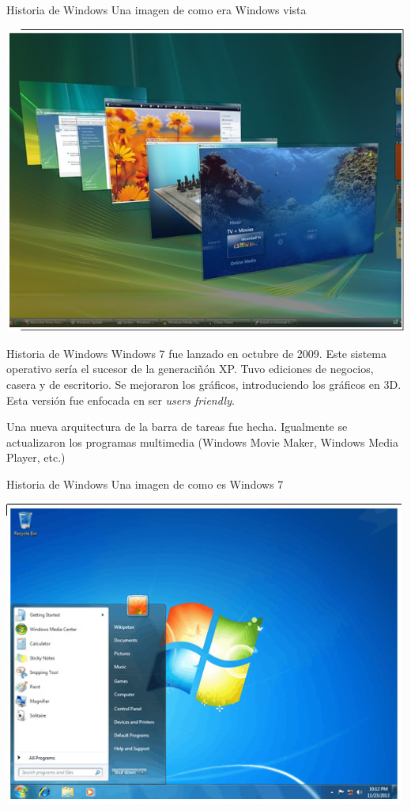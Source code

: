 \documentclass[11pt]{beamer}
\begin{document}
		\begin{frame}{Historia de Windows}
			Una imagen de como era Windows vista
			
			\includegraphics[scale=0.5]{wvista.jpg}
		\end{frame}		
		\begin{frame}{Historia de Windows}
			Windows 7 fue lanzado en octubre de 2009. Este sistema operativo sería el sucesor de la generaciñón XP. Tuvo ediciones de negocios, casera y de escritorio. Se mejoraron los gráficos, introduciendo los gráficos en 3D. Esta versión fue enfocada en ser \textit{users friendly}. 
			
			Una nueva arquitectura de la barra de tareas fue hecha. Igualmente se actualizaron los programas multimedia (Windows Movie Maker, Windows Media Player, etc.)
		\end{frame}
		\begin{frame}{Historia de Windows}
			Una imagen de como es Windows 7
			
			\includegraphics[scale=0.68]{w7.jpg}
		\end{frame}
\end{document}
